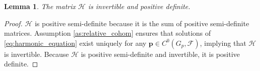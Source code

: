 \documentclass[10pt,a4paper]{amsart}
\newtheorem{lemma}{Lemma}
\newcommand{\FF}{\mathcal{F}}
\begin{document}
\begin{lemma}
    The matrix $\mathcal{H}$ is invertible and positive definite.
\end{lemma}

\begin{proof}
    $\mathcal{H}$ is positive semi-definite because it is the sum of positive semi-definite matrices. Assumption \ref{as:relative_cohom} ensures that solutions of \eqref{eq:harmonic_equation} exist uniquely for any $\mathbf{p}\in C^0(G_p,\FF)$, implying that $\mathcal{H}$ is invertible. Because $\mathcal{H}$ is positive semi-definite and invertible, it is positive definite.
\end{proof}
\end{document}
